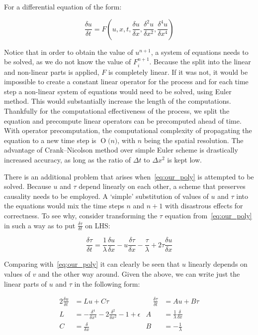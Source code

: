 \documentclass[11pt,a4paper]{article}
\newcommand{\BigO}[1]{\ensuremath{\operatorname{O}\bigl(#1\bigr)}}
\begin{document}
For a differential equation of the form:

\begin{equation}\label{eq:cn_eq}
    \frac{\delta u}{\delta t} = F(u, x, t, \frac{\delta u}{\delta x}, \frac{\delta^2u}{\delta x^2}, \frac{\delta^4u}{\delta x^4})
\end{equation}

Notice that in order to obtain the value of $u^{n+1}$, a system of equations needs to be solved, as we do not know the value of $F^{n+1}_i$.
Because the split into the linear and non-linear parts is applied, $F$ is completely linear.
If it was not, it would be impossible to create a constant linear operator for the process and for each time step a non-linear system of equations would need to be solved, using Euler method.
This would substantially increase the length of the computations.
Thankfully for the computational effectiveness of the process, we split the equation and precompute linear operators can be precomputed ahead of time.
With operator precomputation, the computational complexity of propagating the equation to a new time step is \BigO{n}, with $n$ being the spatial resolution.
The advantage of Crank--Nicolson method over simple Euler scheme is drastically increased accuracy, as long as the ratio of $\Delta t$ to $\Delta x^2$ is kept low.

There is an additional problem that arises when~\eqref{eq:our_poly} is attempted to be solved.
Because $u$ and $\tau$ depend linearly on each other, a scheme that preserves causality needs to be employed.
A `simple' substitution of values of $u$ and $\tau$ into the equations would mix the time steps $n$ and $n+1$ with disastrous effects for correctness.
To see why, consider transforming the $\tau$ equation from~\eqref{eq:our_poly} in such a way as to put $\frac{\delta \tau}{\delta t}$ on LHS:

\begin{equation}\label{eq:tau_transf}
    \frac{\delta \tau}{\delta t} = \frac{1}{\lambda}\frac{\delta u}{\delta x} - u\frac{\delta \tau}{\delta x} - \frac{\tau}{\lambda} + 2\tau\frac{\delta u}{\delta x}
\end{equation}

Comparing with~\eqref{eq:our_poly} it can clearly be seen that $u$ linearly depends on values of $v$ and the other way around.
Given the above, we can write just the linear parts of $u$ and $\tau$ in the following form:

\begin{alignat}{2}
    \frac{\delta u}{\delta t} &= Lu + C\tau &\quad \frac{\delta \tau}{\delta t} &= Au + B\tau\\
    L &= -\frac{\delta^4}{\delta x^4} - 2\frac{\delta^2}{\delta x^2} - 1 + \epsilon & A &= \frac{1}{\lambda}\frac{\delta}{\delta x} \nonumber \\
    C &= \frac{\delta}{\delta x} & B &= - \frac{1}{\lambda} \nonumber
\end{alignat}
\end{document}
